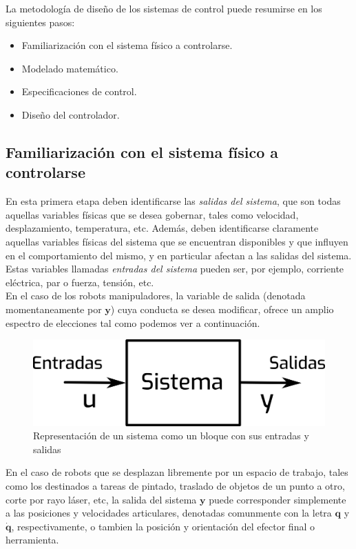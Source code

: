 La metodología de diseño de los sistemas de control puede resumirse en los siguientes pasos:

\begin{itemize}
	\item Familiarización con el sistema físico a controlarse.
	\item Modelado matemático.
	\item Especificaciones de control.
	\item Diseño del controlador.
\end{itemize}

\subsection{Familiarización con el sistema físico a controlarse}

En esta primera etapa deben identificarse las \textit{salidas del sistema}, que son todas aquellas variables físicas que se desea gobernar, tales como velocidad, desplazamiento, temperatura, etc. Además, deben identificarse claramente aquellas variables físicas del sistema que se encuentran disponibles y que influyen en el comportamiento del mismo, y en particular afectan a las salidas del sistema. Estas variables llamadas \textit{entradas del sistema} pueden ser, por ejemplo, corriente eléctrica, par o fuerza, tensión, etc.\\

En el caso de los robots manipuladores, la variable de salida (denotada momentaneamente por $\textbf{y}$) cuya conducta se desea modificar, ofrece un amplio espectro de elecciones tal como podemos ver a continuación.\\

\begin{figure}[h!]
	\centering
	\includegraphics[scale=0.3]{Capitulo3/figs/diagSis.png} 
	\caption{Representación de un sistema como un bloque con sus entradas y salidas}
	\label{dSis}
\end{figure}

En el caso de robots que se desplazan libremente por un espacio de trabajo, tales como los destinados a tareas de pintado, traslado de objetos de un punto a otro, corte por rayo láser, etc, la salida del sistema $\textbf{y}$ puede corresponder simplemente a las posiciones y velocidades articulares, denotadas comunmente con la letra $\textbf{q}$ y  $\dot{\textbf{q}}$, respectivamente, o tambien la posición y orientación del efector final o herramienta.\\

